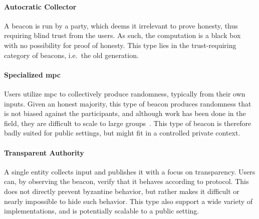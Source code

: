 \paragraph{Autocratic Collector}
A beacon is run by a party, which deems it irrelevant to prove honesty, thus requiring blind trust from the users.
As such, the computation is a black box with no possibility for proof of honesty.
This type lies in the trust-requiring category of beacons, i.e.\ the old generation.

\paragraph{Specialized \acrshort{mpc}}
Users utilize \acrfull{mpc} to collectively produce randomness, typically from their own inputs.
Given an honest majority, this type of beacon produces randomness that is not biased against the participants, and although work has been done in the field, they are difficult to scale to large groups~\cite{cascudo2017scrape, syta2017scalable}.
This type of beacon is therefore badly suited for public settings, but might fit in a controlled private context.

\paragraph{Transparent Authority}
A single entity collects input and publishes it with a focus on transparency.
Users can, by observing the beacon, verify that it behaves according to protocol.
This does not directly prevent byzantine behavior, but rather makes it difficult or nearly impossible to hide such behavior.
This type also support a wide variety of implementations, and is potentially scalable to a public setting.

